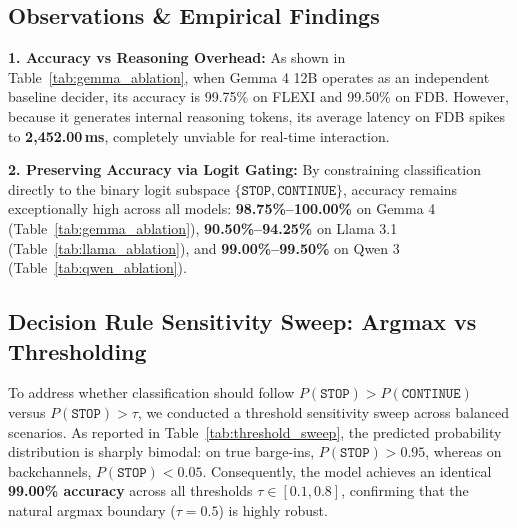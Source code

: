 \documentclass{article}
\begin{document}
\subsection{Observations \& Empirical Findings}

\textbf{1. Accuracy vs Reasoning Overhead:}
As shown in Table~\ref{tab:gemma_ablation}, when Gemma 4 12B operates as an independent baseline decider, its accuracy is 99.75\% on FLEXI and 99.50\% on FDB. However, because it generates internal reasoning tokens, its average latency on FDB spikes to \textbf{2,452.00\,ms}, completely unviable for real-time interaction.

\textbf{2. Preserving Accuracy via Logit Gating:}
By constraining classification directly to the binary logit subspace $\{\texttt{STOP}, \texttt{CONTINUE}\}$, accuracy remains exceptionally high across all models: \textbf{98.75\%--100.00\%} on Gemma 4 (Table~\ref{tab:gemma_ablation}), \textbf{90.50\%--94.25\%} on Llama 3.1 (Table~\ref{tab:llama_ablation}), and \textbf{99.00\%--99.50\%} on Qwen 3 (Table~\ref{tab:qwen_ablation}).

\subsection{Decision Rule Sensitivity Sweep: Argmax vs Thresholding}
To address whether classification should follow $P(\texttt{STOP}) > P(\texttt{CONTINUE})$ versus $P(\texttt{STOP}) > \tau$, we conducted a threshold sensitivity sweep across balanced scenarios. As reported in Table~\ref{tab:threshold_sweep}, the predicted probability distribution is sharply bimodal: on true barge-ins, $P(\texttt{STOP}) > 0.95$, whereas on backchannels, $P(\texttt{STOP}) < 0.05$. Consequently, the model achieves an identical \textbf{99.00\% accuracy} across all thresholds $\tau \in [0.1, 0.8]$, confirming that the natural argmax boundary ($\tau = 0.5$) is highly robust.

\begin{table}[h]
\centering
\caption{\textbf{Threshold Sensitivity Sweep ($\tau \in [0.1, 0.9]$).} Evaluated on Qwen 3 4B across balanced benchmark scenarios.}
\label{tab:threshold_sweep}
\vspace{0.2cm}
\end{table}
\end{document}
